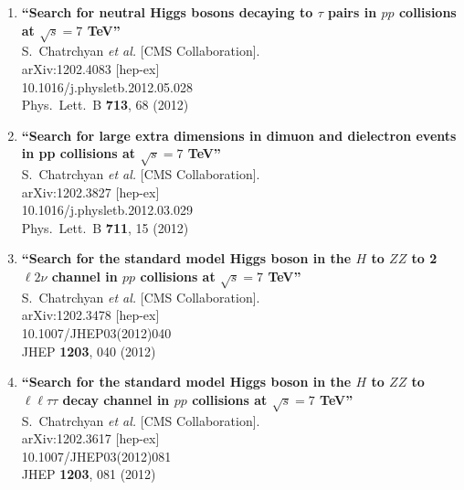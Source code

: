 \documentclass{article}
\begin{document}
\begin{enumerate}
\item%
{\bf ``Search for neutral Higgs bosons decaying to $\tau$ pairs in $pp$ collisions at $\sqrt{s}=7$ TeV''}
  \\{}S.~Chatrchyan {\it et al.}  [CMS Collaboration].
  \\{}arXiv:1202.4083 [hep-ex]
    \\{}10.1016/j.physletb.2012.05.028
\\{}Phys.\ Lett.\ B {\bf 713}, 68 (2012) %


\item%
{\bf ``Search for large extra dimensions in dimuon and dielectron events in pp collisions at $\sqrt{s} = 7$ TeV''}
  \\{}S.~Chatrchyan {\it et al.}  [CMS Collaboration].
  \\{}arXiv:1202.3827 [hep-ex]
    \\{}10.1016/j.physletb.2012.03.029
\\{}Phys.\ Lett.\ B {\bf 711}, 15 (2012) %


\item%
{\bf ``Search for the standard model Higgs boson in the $H$ to $Z Z$ to 2 $\ell 2 \nu$ channel in $pp$ collisions at $\sqrt{s}=7$ TeV''}
  \\{}S.~Chatrchyan {\it et al.}  [CMS Collaboration].
  \\{}arXiv:1202.3478 [hep-ex]
    \\{}10.1007/JHEP03(2012)040
\\{}JHEP {\bf 1203}, 040 (2012) %


\item%
{\bf ``Search for the standard model Higgs boson in the $H$ to $Z Z$ to $\ell \ell \tau \tau$ decay channel in $pp$ collisions at $\sqrt{s}=7$ TeV''}
  \\{}S.~Chatrchyan {\it et al.}  [CMS Collaboration].
  \\{}arXiv:1202.3617 [hep-ex]
    \\{}10.1007/JHEP03(2012)081
\\{}JHEP {\bf 1203}, 081 (2012) %



\end{enumerate}
\end{document}
